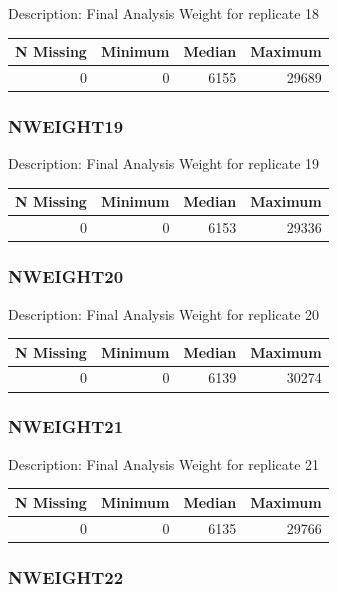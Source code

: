 \documentclass[
]{krantz}
\begin{document}
Description: Final Analysis Weight for replicate 18

\begin{tabular}[t]{r|r|r|r}
\hline
N Missing & Minimum & Median & Maximum\\
\hline
0 & 0 & 6155 & 29689\\
\hline
\end{tabular}

\hypertarget{nweight19}{%
\subsubsection*{NWEIGHT19}\label{nweight19}}


Description: Final Analysis Weight for replicate 19

\begin{tabular}[t]{r|r|r|r}
\hline
N Missing & Minimum & Median & Maximum\\
\hline
0 & 0 & 6153 & 29336\\
\hline
\end{tabular}

\hypertarget{nweight20}{%
\subsubsection*{NWEIGHT20}\label{nweight20}}


Description: Final Analysis Weight for replicate 20

\begin{tabular}[t]{r|r|r|r}
\hline
N Missing & Minimum & Median & Maximum\\
\hline
0 & 0 & 6139 & 30274\\
\hline
\end{tabular}

\hypertarget{nweight21}{%
\subsubsection*{NWEIGHT21}\label{nweight21}}


Description: Final Analysis Weight for replicate 21

\begin{tabular}[t]{r|r|r|r}
\hline
N Missing & Minimum & Median & Maximum\\
\hline
0 & 0 & 6135 & 29766\\
\hline
\end{tabular}

\hypertarget{nweight22}{%
\subsubsection*{NWEIGHT22}\label{nweight22}}
\end{document}

